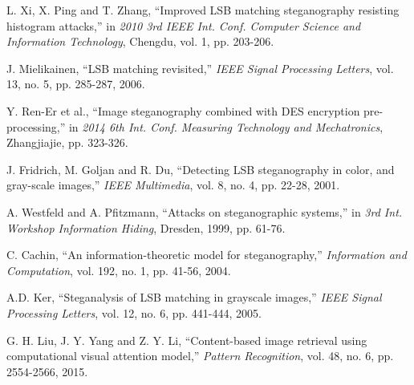 \documentclass[a4paper,10pt,twocolumn]{article}
\begin{document}
\begin{thebibliography}{9}

L. Xi, X. Ping and T. Zhang,
``Improved LSB matching steganography resisting histogram attacks,''
in \textit{2010 3rd IEEE Int. Conf. Computer Science and Information Technology},
Chengdu,
vol. 1, pp. 203-206.

J. Mielikainen, 
``LSB matching revisited,''
\textit{IEEE Signal Processing Letters},
vol. 13, no. 5, pp. 285-287,
2006.

Y. Ren-Er et al., 
``Image steganography combined with DES encryption pre-processing,''
in \textit{2014 6th Int. Conf. Measuring Technology and Mechatronics},
Zhangjiajie,
pp. 323-326.

J. Fridrich, M. Goljan and R. Du,
``Detecting LSB steganography in color, and gray-scale images,''
\textit{IEEE Multimedia},
vol. 8, no. 4, pp. 22-28,
2001.

A. Westfeld and A. Pfitzmann,
``Attacks on steganographic systems,''
in \textit{3rd Int. Workshop Information Hiding},
Dresden,
1999,
pp. 61-76.

C. Cachin,
``An information-theoretic model for steganography,''
\textit{Information and Computation},
vol. 192, no. 1, pp. 41-56, 
2004.

A.D. Ker,
``Steganalysis of LSB matching in grayscale images,''
\textit{IEEE Signal Processing Letters},
vol. 12, no. 6, pp. 441-444, 
2005.

G. H. Liu, J. Y. Yang and Z. Y. Li,
``Content-based image retrieval using computational visual attention model,''
\textit{Pattern Recognition},
vol. 48, no. 6, pp. 2554-2566,
2015.


\end{thebibliography}
\end{document}
